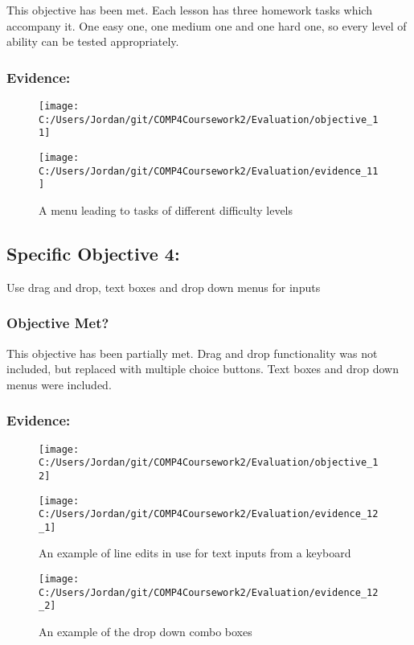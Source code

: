 This objective has been met. Each lesson has three homework tasks which accompany it. One easy one, one medium one and one hard one, so every level of ability can be tested appropriately.

\subsubsection{Evidence: }

\begin{figure}[H]
	\texttt{[image: C:/Users/Jordan/git/COMP4Coursework2/Evaluation/objective\_11]}
\end{figure}

\begin{figure}[H]
	\texttt{[image: C:/Users/Jordan/git/COMP4Coursework2/Evaluation/evidence\_11]}
	\caption{A menu leading to tasks of different difficulty levels}
\end{figure}

\subsection{Specific Objective 4: }

Use drag and drop, text boxes and drop down menus for inputs

\subsubsection{Objective Met?}

This objective has been partially met. Drag and drop functionality was not included, but replaced with multiple choice buttons. Text boxes and drop down menus were included.

\subsubsection{Evidence: }

\begin{figure}[H]
	\texttt{[image: C:/Users/Jordan/git/COMP4Coursework2/Evaluation/objective\_12]}
\end{figure}

\begin{figure}[H]
	\texttt{[image: C:/Users/Jordan/git/COMP4Coursework2/Evaluation/evidence\_12\_1]}
	\caption{An example of line edits in use for text inputs from a keyboard}
\end{figure}

\begin{figure}[H]
	\texttt{[image: C:/Users/Jordan/git/COMP4Coursework2/Evaluation/evidence\_12\_2]}
	\caption{An example of the drop down combo boxes}
\end{figure}

